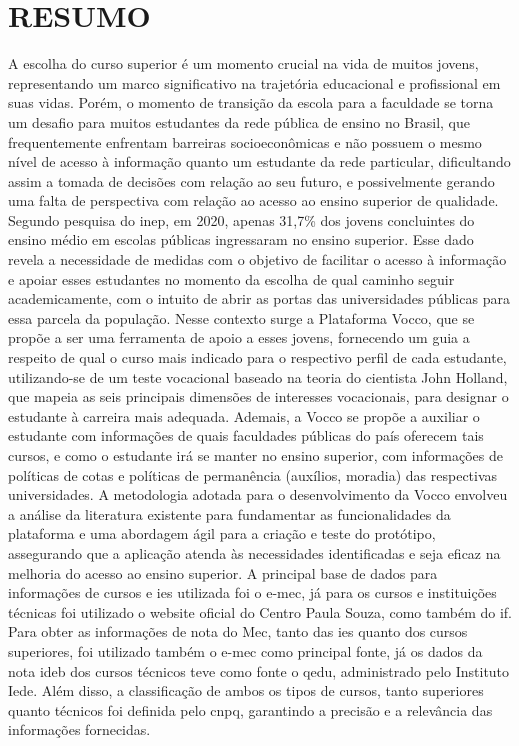 \label{resumo}
\chapter*{RESUMO}
A escolha do curso superior é um momento crucial na vida de muitos jovens, representando um marco significativo na trajetória educacional e profissional em suas vidas. Porém, o momento de transição da escola para a faculdade se torna um desafio para muitos estudantes da rede pública de ensino no Brasil, que frequentemente enfrentam barreiras socioeconômicas e não possuem o mesmo nível de acesso à informação quanto um estudante da rede particular, dificultando assim a tomada de decisões com relação ao seu futuro, e possivelmente gerando uma falta de perspectiva com relação ao acesso ao ensino superior de qualidade. Segundo pesquisa do \ac{inep}, em 2020, apenas 31,7\% dos jovens concluintes do ensino médio em escolas públicas ingressaram no ensino superior. Esse dado revela a necessidade de medidas com o objetivo de facilitar o acesso à informação e apoiar esses estudantes no momento da escolha de qual caminho seguir academicamente, com o intuito de abrir as portas das universidades públicas para essa parcela da população. Nesse contexto surge a Plataforma Vocco, que se propõe a ser uma ferramenta de apoio a esses jovens, fornecendo um guia a respeito de qual o curso mais indicado para o respectivo perfil de cada estudante, utilizando-se de um teste vocacional baseado na teoria do cientista John Holland, que mapeia as seis principais dimensões de interesses vocacionais, para designar o estudante à carreira mais adequada. Ademais, a Vocco se propõe a auxiliar o estudante com informações de quais faculdades públicas do país oferecem tais cursos, e como o estudante irá se manter no ensino superior, com informações de políticas de cotas e políticas de permanência (auxílios, moradia) das respectivas universidades. A metodologia adotada para o desenvolvimento da Vocco envolveu a análise da literatura existente para fundamentar as funcionalidades da plataforma e uma abordagem ágil para a criação e teste do protótipo, assegurando que a aplicação atenda às necessidades identificadas e seja eficaz na melhoria do acesso ao ensino superior. A principal base de dados para informações de cursos e \ac{ies} utilizada foi o \ac{e-mec}, já para os cursos e instituições técnicas foi utilizado o website oficial do Centro Paula Souza, como também do  \ac{if}.
Para obter as informações de nota do Mec, tanto das \ac{ies} quanto dos cursos superiores, foi utilizado também o \ac{e-mec} como principal fonte, já os dados da nota \ac{ideb} dos cursos técnicos teve como fonte o \ac{qedu}, administrado pelo Instituto Iede.
Além disso, a classificação de ambos os tipos de cursos, tanto superiores quanto técnicos foi definida pelo \ac{cnpq}, garantindo a precisão e a relevância das informações fornecidas.



